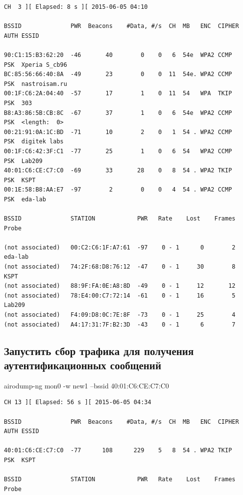 \documentclass[11pt, a4paper]{article}		%
\begin{document}
\begin{verbatim}
CH  3 ][ Elapsed: 8 s ][ 2015-06-05 04:10                                         

BSSID              PWR  Beacons    #Data, #/s  CH  MB   ENC  CIPHER AUTH ESSID

90:C1:15:B3:62:20  -46       40        0    0   6  54e  WPA2 CCMP   PSK  Xperia S_cb96               
BC:85:56:66:40:8A  -49       23        0    0  11  54e. WPA2 CCMP   PSK  nastroisam.ru               
00:1F:C6:2A:04:40  -57       17        1    0  11  54   WPA  TKIP   PSK  303                         
B8:A3:86:5B:CB:8C  -67       37        1    0   6  54e  WPA2 CCMP   PSK  <length:  0>                
00:21:91:0A:1C:BD  -71       10        2    0   1  54 . WPA2 CCMP   PSK  digitek labs                
00:1F:C6:42:3F:C1  -77       25        1    0   6  54   WPA2 CCMP   PSK  Lab209                      
40:01:C6:CE:C7:C0  -69       33       28    0   8  54 . WPA2 TKIP   PSK  KSPT                        
00:1E:58:B8:AA:E7  -97        2        0    0   4  54 . WPA2 CCMP   PSK  eda-lab                     

BSSID              STATION            PWR   Rate    Lost    Frames  Probe                            

(not associated)   00:C2:C6:1F:A7:61  -97    0 - 1      0        2  eda-lab                           
(not associated)   74:2F:68:D8:76:12  -47    0 - 1     30        8  KSPT                              
(not associated)   88:9F:FA:0E:A8:8D  -49    0 - 1     12       12                                    
(not associated)   78:E4:00:C7:72:14  -61    0 - 1     16        5  Lab209                            
(not associated)   F4:09:D8:0C:7E:8F  -73    0 - 1     25        4                                    
(not associated)   A4:17:31:7F:B2:3D  -43    0 - 1      6        7          
\end{verbatim}




\subsection{Запустить сбор трафика для получения аутентификационных сообщений}

airodump-ng mon0 -w new1 --bssid 40:01:C6:CE:C7:C0 

\begin{verbatim}
CH 13 ][ Elapsed: 56 s ][ 2015-06-05 04:34                                    

BSSID              PWR  Beacons    #Data, #/s  CH  MB   ENC  CIPHER AUTH ESSID

40:01:C6:CE:C7:C0  -77      108      229    5   8  54 . WPA2 TKIP   PSK  KSPT 

BSSID              STATION            PWR   Rate    Lost    Frames  Probe     
\end{verbatim}
\end{document}
